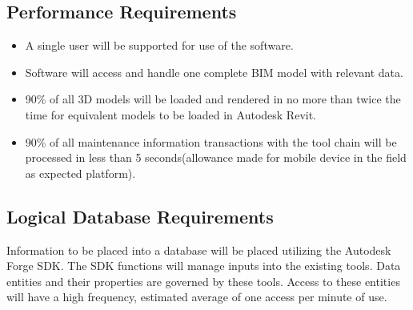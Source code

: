 \documentclass[onecolumn, draftclsnofoot,10pt, compsoc]{IEEEtran}
\begin{document}
    \subsection{Performance Requirements}
       \begin{itemize}
           \item A single user will be supported for use of the software.
           \item Software will access and handle one complete BIM model with relevant data.
           \item 90\% of all 3D models will be loaded and rendered in no more than twice the time for equivalent models to be loaded in Autodesk Revit.
           \item 90\% of all maintenance information transactions with the tool chain will be processed in less than 5 seconds(allowance made for mobile device in the field as expected platform).
       \end{itemize}

    \subsection{Logical Database Requirements}
        Information to be placed into a database will be placed utilizing the Autodesk Forge SDK. The SDK functions will manage inputs into the existing tools. Data entities and their properties are governed by these tools. Access to these entities will have a high frequency, estimated average of one access per minute of use.
\end{document}
